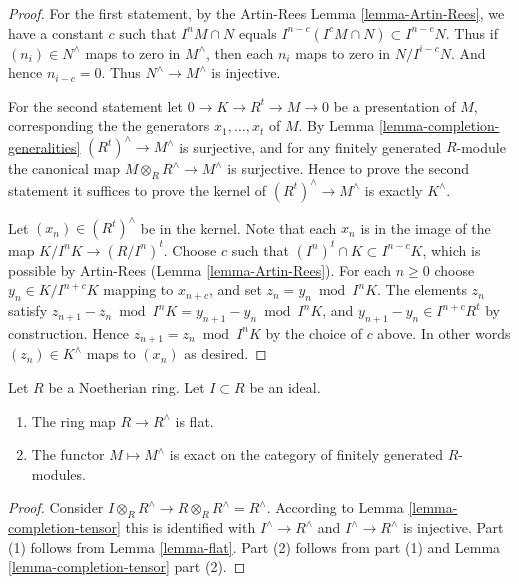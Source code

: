 \begin{proof}
For the first statement, by the Artin-Rees Lemma \ref{lemma-Artin-Rees},
we have a constant $c$ such that $I^nM \cap N$
equals $I^{n-c}(I^cM \cap N) \subset I^{n-c}N$.
Thus if $(n_i) \in N^\wedge$ maps to zero in
$M^\wedge$, then each $n_i$ maps to zero in $N/I^{i-c}N$.
And hence $n_{i-c} = 0$. Thus $N^\wedge \to M^\wedge$ is injective.

\medskip\noindent
For the second statement let $0 \to K \to R^t \to M \to 0$
be a presentation of $M$, corresponding the the generators
$x_1, \ldots, x_t$ of $M$. By Lemma \ref{lemma-completion-generalities}
$(R^t)^\wedge \to M^\wedge$ is surjective,
and for any finitely generated $R$-module the
canonical map $M \otimes_R R^\wedge \to M^\wedge$ is surjective.
Hence to prove the second statement it suffices
to prove the kernel of $(R^t)^\wedge \to M^\wedge$ is
exactly $K^\wedge$.

\medskip\noindent
Let $(x_n) \in (R^t)^\wedge$ be in the kernel. Note that
each $x_n$ is in the image of the map $K/I^nK \to (R/I^n)^t$.
Choose $c$ such that $(I^n)^t \cap K \subset I^{n-c} K$,
which is possible by Artin-Rees (Lemma \ref{lemma-Artin-Rees}).
For each $n \geq 0$ choose $y_n \in K/I^{n + c}K$ mapping to $x_{n + c}$,
and set $z_n = y_n \bmod I^nK$. The elements $z_n$ satisfy
$z_{n + 1} - z_n \bmod I^nK = y_{n + 1} - y_{n} \bmod I^nK$,
and $y_{n + 1} - y_n \in I^{n + c}R^t$ by construction. Hence
$z_{n + 1} = z_n \bmod I^nK$ by the choice of $c$ above. In other
words $(z_n) \in K^\wedge$ maps to $(x_n)$ as desired.
\end{proof}

\begin{lemma}
\label{lemma-completion-flat}
Let $R$ be a Noetherian ring.
Let $I \subset R$ be an ideal.
\begin{enumerate}
\item The ring map $R \to R^\wedge$ is flat.
\item The functor $M \mapsto M^\wedge$ is exact on the category of
finitely generated $R$-modules.
\end{enumerate}
\end{lemma}

\begin{proof}
Consider $I \otimes_R R^\wedge \to R\otimes_R R^\wedge = R^\wedge$.
According to Lemma \ref{lemma-completion-tensor} this
is identified with $I^\wedge \to R^\wedge$ and $I^\wedge \to R^\wedge$
is injective. Part (1) follows from Lemma \ref{lemma-flat}.
Part (2) follows from part (1) and
Lemma \ref{lemma-completion-tensor} part (2).
\end{proof}

